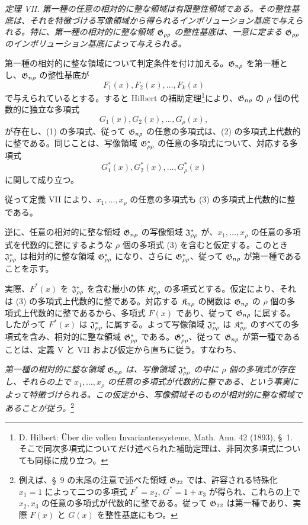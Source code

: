 \documentclass[11pt]{article}
\begin{document}
\emph{定理 VII. 第一種の任意の相対的に整な領域は有限整性領域である。その整性基底は、それを特徴づける写像領域から得られるインボリューション基底で与えられる。特に、第一種の相対的に整な領域 $\mathfrak{G}_{\rho\rho}$ の整性基底は、一意に定まる $\mathfrak{G}_{\rho\rho}$ のインボリューション基底によって与えられる。}

第一種の相対的に整な領域について判定条件を付け加える。$\mathfrak{G}_{n\rho}$ を第一種とし、$\mathfrak{G}_{n\rho}$ の整性基底が
\begin{equation}
  F_1(x),F_2(x),\ldots,F_k(x)
\tag{1}
\end{equation}
で与えられているとする。すると Hilbert の補助定理\footnote{D. Hilbert: Über die vollen Invariantensysteme, Math. Ann. 42 (1893), \S\ 1. そこで同次多項式についてだけ述べられた補助定理は、非同次多項式についても同様に成り立つ。}により、$\mathfrak{G}_{n\rho}$ の $\rho$ 個の代数的に独立な多項式
\begin{equation}
  G_1(x),G_2(x),\ldots,G_\rho(x),
\tag{2}
\end{equation}
が存在し、(1) の多項式、従って $\mathfrak{G}_{n\rho}$ の任意の多項式は、(2) の多項式上代数的に整である。同じことは、写像領域 $\mathfrak{G}^*_{\rho\rho}$ の任意の多項式について、対応する多項式
\begin{equation}
  G_1^*(x),G_2^*(x),\ldots,G_\rho^*(x)
\tag{3}
\end{equation}
に関して成り立つ。

従って定義 VII により、$x_1,\ldots,x_\rho$ の任意の多項式も (3) の多項式上代数的に整である。

逆に、任意の相対的に整な領域 $\mathfrak{G}_{n\rho}$ の写像領域 $\mathfrak{J}^*_{\rho\rho}$ が、$x_1,\ldots,x_\rho$ の任意の多項式を代数的に整にするような $\rho$ 個の多項式 (3) を含むと仮定する。このとき $\mathfrak{J}^*_{\rho\rho}$ は相対的に整な領域 $\mathfrak{G}^*_{\rho\rho}$ になり、さらに $\mathfrak{G}^*_{\rho\rho}$、従って $\mathfrak{G}_{n\rho}$ が第一種であることを示す。

実際、$F^*(x)$ を $\mathfrak{J}^*_{\rho\rho}$ を含む最小の体 $\mathfrak{K}^*_{\rho\rho}$ の多項式とする。仮定により、それは (3) の多項式上代数的に整である。対応する $\mathfrak{K}_{n\rho}$ の関数は $\mathfrak{G}_{n\rho}$ の $\rho$ 個の多項式上代数的に整であるから、多項式 $F(x)$ であり、従って $\mathfrak{G}_{n\rho}$ に属する。したがって $F^*(x)$ は $\mathfrak{J}^*_{\rho\rho}$ に属する。よって写像領域 $\mathfrak{J}^*_{\rho\rho}$ は $\mathfrak{K}^*_{\rho\rho}$ のすべての多項式を含み、相対的に整な領域 $\mathfrak{G}^*_{\rho\rho}$ である。$\mathfrak{G}^*_{\rho\rho}$、従って $\mathfrak{G}_{n\rho}$ が第一種であることは、定義 V と VII および仮定から直ちに従う。すなわち、

\emph{第一種の相対的に整な領域 $\mathfrak{G}_{n\rho}$ は、写像領域 $\mathfrak{J}^*_{\rho\rho}$ の中に $\rho$ 個の多項式が存在し、それらの上で $x_1,\ldots,x_\rho$ の任意の多項式が代数的に整である、という事実によって特徴づけられる。この仮定から、写像領域そのものが相対的に整な領域であることが従う。}\footnote{例えば、\S\ 9 の末尾の注意で述べた領域 $\mathfrak{G}_{22}$ では、許容される特殊化 $x_1=1$ によって二つの多項式 $F^*=x_2$, $G^*=1+x_3$ が得られ、これらの上で $x_2,x_3$ の任意の多項式が代数的に整である。従って $\mathfrak{G}_{22}$ は第一種であり、実際 $F(x)$ と $G(x)$ を整性基底にもつ。}
\end{document}
